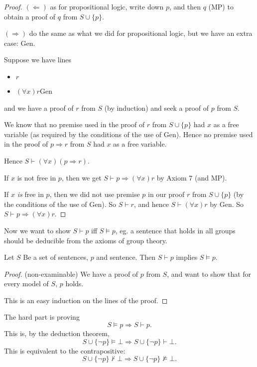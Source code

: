 \documentclass[a4paper]{article}
\begin{document}
\begin{proof}
  $(\Leftarrow)$ as for propositional logic, write down $p$, and then $q$ (MP) to obtain a proof of $q$ from $S\cup \{p\}$.

  $(\Rightarrow)$ do the same as what we did for propositional logic, but we have an extra case: Gen.

  Suppose we have lines
  \begin{itemize}
    \item $r$
    \item $(\forall x) r$\hfill Gen
  \end{itemize}
  and we have a proof of $r$ from $S$ (by induction) and seek a proof of $p$ from $S$.

  We know that no premise used in the proof of $r$ from $S\cup \{p\}$ had $x$ as a free variable (as required by the conditions of the use of Gen). Hence no premise used in the proof of $p\Rightarrow r$ from $S$ had $x$ as a free variable.

  Hence $S\vdash (\forall x)(p\Rightarrow r)$.

  If $x$ is not free in $p$, then we get $S\vdash p\Rightarrow (\forall x)r$ by Axiom 7 (and MP).

  If $x$ \emph{is} free in $p$, then we did not use premise $p$ in our proof $r$ from $S\cup \{p\}$ (by the conditions of the use of Gen). So $S\vdash r$, and hence $S\vdash (\forall x)r$ by Gen. So $S\vdash p\Rightarrow (\forall x)r$.
\end{proof}

Now we want to show $S\vdash p$ iff $S\models p$, eg. a sentence that holds in all groups should be deducible from the axioms of group theory.

\begin{prop}
  Let $S$ Be a set of sentences, $p$ and sentence. Then $S\vdash p$ implies $S\models p$.
\end{prop}

\begin{proof}(non-examinable) 
  We have a proof of $p$ from $S$, and want to show that for every model of $S$, $p$ holds.

  This is an easy induction on the lines of the proof.
\end{proof}

The hard part is proving 
\[
  S\models p \Rightarrow  S\vdash p.
\]
This is, by the deduction theorem, 
\[
  S\cup \{\neg p\}\models \bot \Rightarrow  S\cup \{\neg p\}\vdash \bot.
\]
This is equivalent to the contrapositive: 
\[
  S\cup \{\neg p\} \not\vdash \bot \Rightarrow  S\cup \{\neg p\}\not\models \bot.
\]
\end{document}
